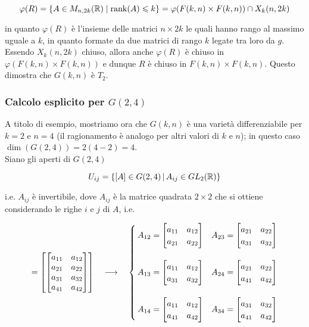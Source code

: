 \begin{equation}
	\varphi(R) = \{ A \in M_{n,2k}(\mathbb{R}) \mid \rank(A) \leqslant k \} = \varphi(F(k,n) \times F(k,n)) \cap X_{k}(n,2k)
\end{equation}

in quanto $ \varphi(R) $ è l'insieme delle matrici $ n \times 2k $ le quali hanno rango al massimo uguale a $ k $, in quanto formate da due matrici di rango $ k $ legate tra loro da $ g $. Essendo $ X_{k}(n,2k) $ chiuso, allora anche $ \varphi(R) $ è chiuso in $ \varphi(F(k,n) \times F(k,n)) $ e dunque $ R $ è chiuso in $ F(k,n) \times F(k,n) $. Questo dimostra che $ G(k,n) $ è $ T_{2} $.

\subsubsection{Calcolo esplicito per $ G(2,4) $}

A titolo di esempio, mostriamo ora che $ G(k,n) $ è una varietà differenziabile per $ k=2 $ e $ n=4 $ (il ragionamento è analogo per altri valori di $ k $ e $ n $); in questo caso $ \dim(G(2,4)) = 2(4-2) = 4 $. \\
Siano gli aperti di $ G(2,4) $

\begin{equation}
	U_{ij} = \left\{ [A] \in G(2,4) \, \middle| \, A_{ij} \in GL_{2}(\mathbb{R}) \right\}
\end{equation}

i.e. $ A_{ij} $ è invertibile, dove $ A_{ij} $ è la matrice quadrata $ 2 \times 2 $ che si ottiene considerando le righe $ i $ e $ j $ di $ A $, i.e.

\begin{equation}
	[A] = \left[ \bmqty{ a_{11} & a_{12} \\ a_{21} & a_{22} \\ a_{31} & a_{32} \\ a_{41} & a_{42} } \right] %
	\quad \longrightarrow \quad %
	\begin{cases}
		A_{12} = \bmqty{ a_{11} & a_{12} \\ a_{21} & a_{22} } & A_{23} = \bmqty{ a_{21} & a_{22} \\ a_{31} & a_{32} } \\ \\
		A_{13} = \bmqty{ a_{11} & a_{12} \\ a_{31} & a_{32} } & A_{24} = \bmqty{ a_{21} & a_{22} \\ a_{41} & a_{42} } \\ \\
		A_{14} = \bmqty{ a_{11} & a_{12} \\ a_{41} & a_{42} } & A_{34} = \bmqty{ a_{31} & a_{32} \\ a_{41} & a_{42} }
	\end{cases}
\end{equation}

